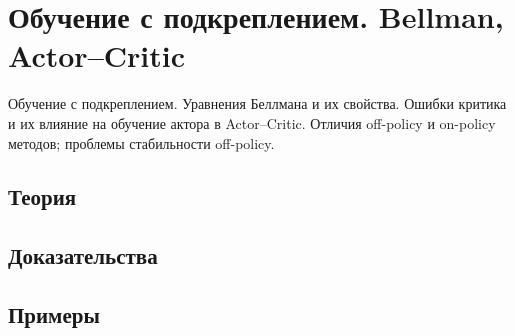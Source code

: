 
\section{Обучение с подкреплением. Bellman, Actor–Critic}
\label{sec:2.5.10-reinforcement-learning}

\begin{ticket}
Обучение с подкреплением. Уравнения Беллмана и их свойства. Ошибки критика и их влияние на обучение актора в Actor–Critic. Отличия off-policy и on-policy методов; проблемы стабильности off-policy.
\end{ticket}

\subsection*{Теория}

\subsection*{Доказательства}

\subsection*{Примеры}
